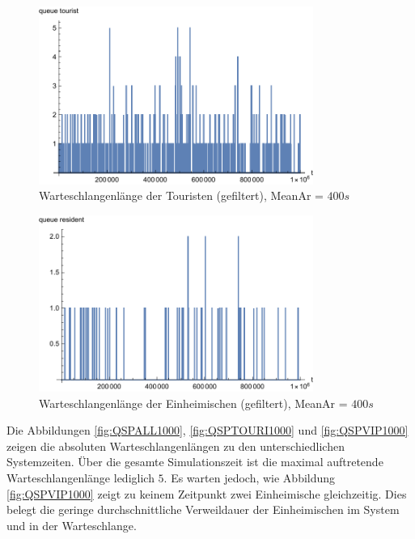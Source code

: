 \begin{figure}[htpb]
	\centering
	\includegraphics[width=0.8\textwidth]{abbildungen/1_Phone_VIP/Arrival_400_Serve_100_dur_1000000_Skip_0/QueueStepPlotTouristFiltered.pdf}
	\caption{Warteschlangenlänge der Touristen (gefiltert), MeanAr = $400s$}
	\label{fig:QSPTOURI400}
\end{figure}

\begin{figure}[htpb]
	\centering
	\includegraphics[width=0.8\textwidth]{abbildungen/1_Phone_VIP/Arrival_400_Serve_100_dur_1000000_Skip_0/QueueStepPlotResidentFiltered.pdf}
	\caption{Warteschlangenlänge der Einheimischen (gefiltert), MeanAr = $400s$}
	\label{fig:QSPVIP400}
\end{figure}

Die Abbildungen \ref{fig:QSPALL1000}, \ref{fig:QSPTOURI1000} und \ref{fig:QSPVIP1000} zeigen die absoluten Warteschlangenlängen zu den unterschiedlichen Systemzeiten. Über die gesamte Simulationszeit ist die maximal auftretende Warteschlangenlänge lediglich $5$. Es warten jedoch, wie Abbildung \ref{fig:QSPVIP1000} zeigt zu keinem Zeitpunkt zwei Einheimische gleichzeitig. Dies belegt die geringe durchschnittliche Verweildauer der Einheimischen im System und in der Warteschlange.

